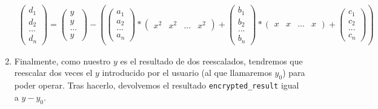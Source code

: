 \begin{enumerate}
    \begin{gather}
      \label{form:distancias_seal}
        \begin{pmatrix}
            d_1 \\
            d_2 \\
            ... \\
            d_n
        \end{pmatrix} 
        = 
        \begin{pmatrix}
            y \\
            y \\
            ... \\
            y
        \end{pmatrix}
        - (
        \begin{pmatrix}
            a_1 \\
            a_2 \\
            ... \\
            a_n
        \end{pmatrix}
        *
        \begin{pmatrix}
            x^2 & x^2 & ... & x^2
        \end{pmatrix}
        +
        \begin{pmatrix}
            b_1 \\
            b_2 \\
            ... \\
            b_n
        \end{pmatrix}
        *
        \begin{pmatrix}
            x & x & ... & x
        \end{pmatrix}
        +
        \begin{pmatrix}
            c_1 \\
            c_2 \\
            ... \\
            c_n
        \end{pmatrix}
        )
    \end{gather}

    \item Finalmente, como nuestro $y$ es el resultado de dos reescalados, tendremos que reescalar dos veces el $y$ introducido por el usuario (al que llamaremos $y_0$) para poder operar. Tras hacerlo, devolvemos el resultado \verb|encrypted_result| igual a $y - y_0$.
    
\end{enumerate}

